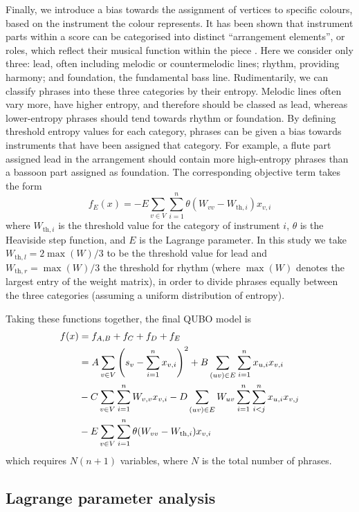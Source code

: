 \documentclass[twocolumn]{article}
\theoremstyle{definition}
\begin{document}
Finally, we introduce a bias towards the assignment of vertices to specific colours, based on the instrument the colour represents. It has been shown that instrument parts within a score can be categorised into distinct ``arrangement elements'', or roles, which reflect their musical function within the piece \cite{owsinski_mixing_2017}. Here we consider only three: lead, often including melodic or countermelodic lines; rhythm, providing harmony; and foundation, the fundamental bass line. Rudimentarily, we can classify phrases into these three categories by their entropy. Melodic lines often vary more, have higher entropy, and therefore should be classed as lead, whereas lower-entropy phrases should tend towards rhythm or foundation. By defining threshold entropy values for each category, phrases can be given a bias towards instruments that have been assigned that category. For example, a flute part assigned lead in the arrangement should contain more high-entropy phrases than a bassoon part assigned as foundation. The corresponding objective term takes the form
\begin{equation}
    f_E(x) = -E\sum_{v\in V}\sum_{i=1}^n \theta(W_{vv} - W_{\text{th},i})x_{v,i}
\end{equation}
where $W_{\text{th},i}$ is the threshold value for the category of instrument $i$, $\theta$ is the Heaviside step function, and $E$ is the Lagrange parameter. In this study we take ${W_{\text{th},l}=2\max(W)/3}$ to be the threshold value for lead and ${W_{\text{th},r}=\max(W)/3}$ the threshold for rhythm (where $\max(W)$ denotes the largest entry of the weight matrix), in order to divide phrases equally between the three categories (assuming a uniform distribution of entropy).

Taking these functions together, the final QUBO model is
\begin{align}
    f(x)&=f_{A,B}+f_C+f_D+f_E \notag\\
    &=A\sum_{v \in V}\left(s_v-\sum_{i=1}^{n} x_{v,i}\right)^2+B\sum_{(uv) \in E}\sum_{i=1}^n x_{u,i}x_{v,i} \notag\\
    &-C\sum_{v \in V}\sum_{i=1}^n W_{v,v}x_{v,i}-D\sum_{(uv)\in E}W_{uv}\sum_{i=1}^n\sum_{i<j}^n x_{u,i}x_{v,j}\notag\\
    &-E\sum_{v \in V}\sum_{i=1}^n\theta(W_{vv}-W_{\text{th},i})x_{v,i}
    \label{eq:problem-qubo}
\end{align}
which requires $N(n+1)$ variables, where $N$ is the total number of phrases.

\subsection*{Lagrange parameter analysis}
\end{document}

